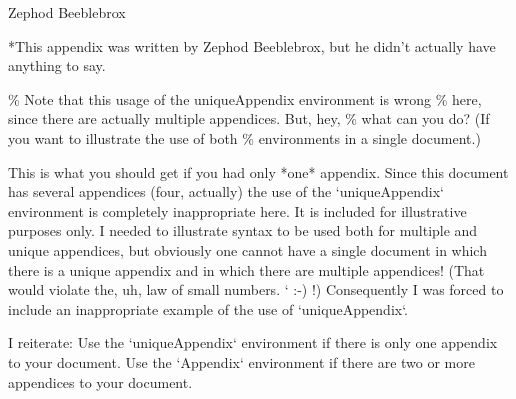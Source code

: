 \documentclass[
  times,
  doublespace]{anzsauth}
\begin{document}
\begin{Appendix}
\label{app:zephod}
\begin{center}
Zephod Beeblebrox
\end{center}

*This appendix was written by Zephod Beeblebrox, but he didn't
actually have anything to say. \lipsum[3]
\end{Appendix}

\% Note that this usage of the uniqueAppendix environment is wrong \%
here, since there are actually multiple appendices. But, hey, \% what
can you do? (If you want to illustrate the use of both \% environments
in a single document.)

\begin{uniqueAppendix}
This is what you should get if you had only *one* appendix.
Since this document has several appendices (four, actually) the
use of the `uniqueAppendix` environment is completely
inappropriate here.  It is included for illustrative purposes
only.  I needed to illustrate syntax to be used both for multiple
and unique appendices, but obviously one cannot have a single
document in which there is a unique appendix and in which there are
multiple appendices!  (That would violate the, uh, law of small
numbers. ` :-) !)  Consequently I was forced to include an
inappropriate example of the use of `uniqueAppendix`.

I reiterate:  Use the `uniqueAppendix` environment if there is
only one appendix to your document.  Use the `Appendix`
environment if there are two or more appendices to your document.
\end{uniqueAppendix}
\end{document}
